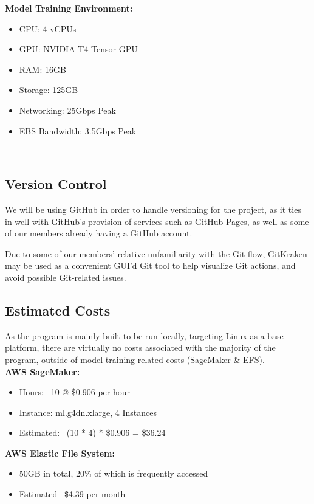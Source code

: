 \documentclass[conference]{IEEEtran}
\begin{document}
\textbf{Model Training Environment:}
\begin{itemize}
\item CPU: 4 vCPUs
\item GPU: NVIDIA T4 Tensor GPU
\item RAM: 16GB
\item Storage: 125GB
\item Networking: 25Gbps Peak
\item EBS Bandwidth: 3.5Gbps Peak
\end{itemize}~\\

\subsection{Version Control}
We will be using GitHub in order to handle versioning for the project, as it ties in well with GitHub's provision of services such as GitHub Pages, as well as some of our members already having a GitHub account.

Due to some of our members' relative unfamiliarity with the Git flow, GitKraken may be used as a convenient GUI'd Git tool to help visualize Git actions, and avoid possible Git-related issues.
\newline

\subsection{Estimated Costs}
As the program is mainly built to be run locally, targeting Linux as a base platform, there are virtually no costs associated with the majority of the program, outside of model training-related costs (SageMaker \& EFS).~\\

\textbf{AWS SageMaker:}
\begin{itemize}
\item Hours: ~10 @ \$0.906 per hour
\item Instance: ml.g4dn.xlarge, 4 Instances
\item Estimated: ~(10 * 4) * \$0.906 = \$36.24
\end{itemize}

\textbf{AWS Elastic File System:}
\begin{itemize}
\item 50GB in total, 20\% of which is frequently accessed
\item Estimated ~\$4.39 per month
\end{itemize}~\\
\end{document}
